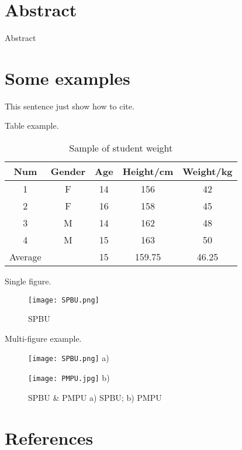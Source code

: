 


\tableofcontents
\setcounter{page}{2}
\clearpage

\section*{Abstract}

Abstract


\clearpage
\section{Some examples}

This sentence just show how to cite\cite{oetiker1995not}.

Table example.
\begin{table}[ht]
    \centering
    \caption{Sample of student weight}
    \label{tab:1}
        \begin{tabular}{ccccc}
        \toprule
        Num&Gender&Age&Height/cm&Weight/kg\\
        \midrule
        1&F&14&156&42\\
        2&F&16&158&45\\
        3&M&14&162&48\\
        4&M&15&163&50\\
        \cmidrule{3-5} %
        Average& &15&159.75&46.25\\
        \bottomrule
        \end{tabular}
\end{table}

Single figure.
\begin{figure}[ht]
    \centering
      \texttt{[image: SPBU.png]}
      \caption{SPBU}
      \label{fig:SPBU}
\end{figure}

\clearpage

Multi-figure example.
\begin{figure}[ht]
    \centering
    \begin{minipage}[t]{\imagewidth}
    \centering
    \texttt{[image: SPBU.png]}
    a)
    \end{minipage} \hspace{4pt}
    \begin{minipage}[t]{\imagewidth}
    \centering
    \texttt{[image: PMPU.jpg]}
    b)
    \end{minipage}
    \caption{SPBU \& PMPU a) SPBU; b) PMPU}
\end{figure}

\section*{References}
\printbibliography[heading=none]
 